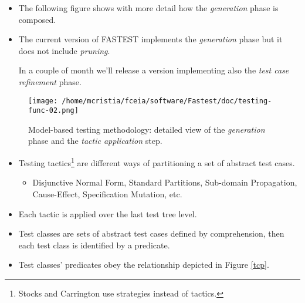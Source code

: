 \begin{itemize}


\item The following figure shows with more detail how the {\it generation} phase is composed.

\item The current version of FASTEST implements the {\it generation} phase but it does not include {\it pruning}. 

In a couple of month we'll release a version implementing also the {\it test case refinement} phase.

\end{itemize}

\begin{figure}[h]
\begin{center}
\texttt{[image: /home/mcristia/fceia/software/Fastest/doc/testing-func-02.png]}
\caption{Model-based testing methodology: detailed view of the {\it generation} phase and the {\it tactic application} step.}
\end{center}
\end{figure}

\begin{itemize}

\item Testing tactics\footnote{Stocks and Carrington use strategies instead of tactics.} are different ways of partitioning a set of abstract test cases.

\begin{itemize}
\item Disjunctive Normal Form, Standard Partitions, Sub-domain Propagation, Cause-Effect, Specification Mutation, etc.
\end{itemize}

\item Each tactic is applied over the last test tree level.

\item Test classes are sets of abstract test cases defined by comprehension, then each test class is identified by a predicate.

\item Test classes' predicates obey the relationship depicted in Figure \ref{tcp}.

\end{itemize}

